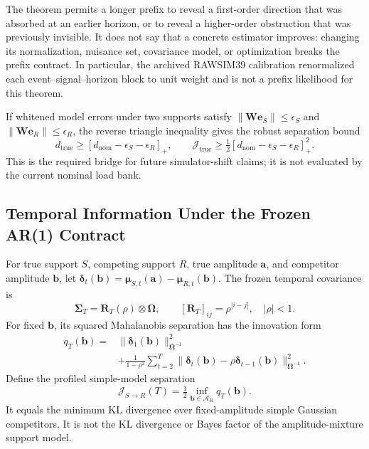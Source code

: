 The theorem permits a longer prefix to reveal a first-order direction that was
absorbed at an earlier horizon, or to reveal a higher-order obstruction that
was previously invisible. It does not say that a concrete estimator improves:
changing its normalization, nuisance set, covariance model, or optimization
breaks the prefix contract. In particular, the archived RAWSIM39 calibration
renormalized each event--signal--horizon block to unit weight and is not a
prefix likelihood for this theorem.

If whitened model errors under two supports satisfy
$\|\bm W\bm e_S\|\le\epsilon_S$ and
$\|\bm W\bm e_R\|\le\epsilon_R$, the reverse triangle inequality gives the robust separation bound
\begin{equation}
 d_{\mathrm{true}}
 \ge[d_{\mathrm{nom}}-\epsilon_S-\epsilon_R]_+,
 \qquad
 \mathcal J_{\mathrm{true}}
 \ge\tfrac12[d_{\mathrm{nom}}-\epsilon_S-\epsilon_R]_+^2.
 \label{eq:supp-robust-separation}
\end{equation}
This is the required bridge for future simulator-shift claims; it is not evaluated by the current nominal load bank.

\subsection{Temporal Information Under the Frozen AR(1) Contract}

For true support $S$, competing support $R$, true amplitude $\bm a$, and competitor amplitude $\bm b$, let
$\bm\delta_t(\bm b)=\bm\mu_{S,t}(\bm a)-\bm\mu_{R,t}(\bm b)$.
The frozen temporal covariance is
\begin{equation}
 \bm\Sigma_T=\bm R_T(\rho)\otimes\bm\Omega,
 \qquad [\bm R_T]_{ij}=\rho^{|i-j|},\quad |\rho|<1.
 \label{eq:supp-ar1-covariance}
\end{equation}
For fixed $\bm b$, its squared Mahalanobis separation has the innovation form
\begin{align}
 q_T(\bm b)={}&\|\bm\delta_1(\bm b)\|_{\bm\Omega^{-1}}^2\nonumber\\
 &+\frac{1}{1-\rho^2}\sum_{t=2}^{T}
 \|\bm\delta_t(\bm b)-\rho\bm\delta_{t-1}(\bm b)\|_{\bm\Omega^{-1}}^2.
 \label{eq:supp-ar1-innovation-information}
\end{align}
Define the profiled simple-model separation
\begin{equation}
 \mathcal J_{S\rightarrow R}(T)=\tfrac12\inf_{\bm b\in\mathcal A_R}q_T(\bm b).
 \label{eq:supp-profiled-temporal-information}
\end{equation}
It equals the minimum KL divergence over fixed-amplitude simple Gaussian competitors. It is not the KL divergence or Bayes factor of the amplitude-mixture support model.

